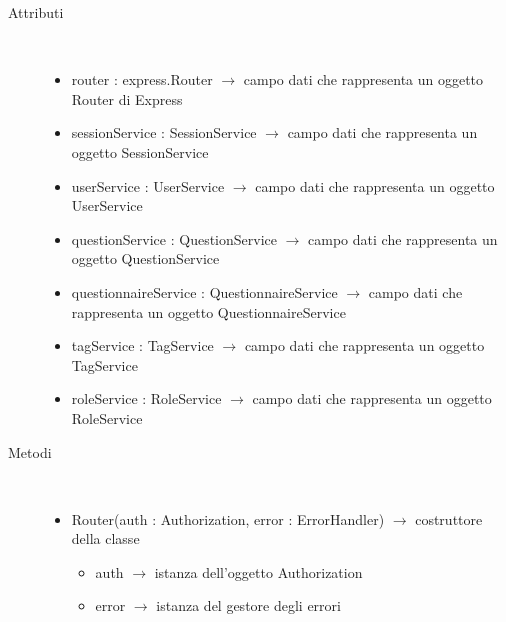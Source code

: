 \begin{description}
\item[Attributi] \hfill \\
\vspace{-7mm}
\begin{itemize}
	\item router : express.Router $\rightarrow$ campo dati che rappresenta un oggetto Router di Express
	\item sessionService : SessionService $\rightarrow$ campo dati che rappresenta un oggetto SessionService
	\item userService : UserService $\rightarrow$ campo dati che rappresenta un oggetto UserService
	\item questionService : QuestionService $\rightarrow$ campo dati che rappresenta un oggetto QuestionService
	\item questionnaireService : QuestionnaireService $\rightarrow$ campo dati che rappresenta un oggetto QuestionnaireService
	\item tagService : TagService $\rightarrow$ campo dati che rappresenta un oggetto TagService
	\item roleService : RoleService $\rightarrow$ campo dati che rappresenta un oggetto RoleService
\end{itemize}

\item[Metodi] \hfill \\
\vspace{-7mm}
\begin{itemize}
	\item Router(auth : Authorization, error : ErrorHandler) $\rightarrow$ costruttore della classe\begin{itemize}
		\item auth $\rightarrow$ istanza dell'oggetto Authorization
		\item error $\rightarrow$ istanza del gestore degli errori
	\end{itemize}
	
\end{itemize}

\end{description}

\vspace{0.5cm}
\hypertarget{server::middleware::Authorization}{}
